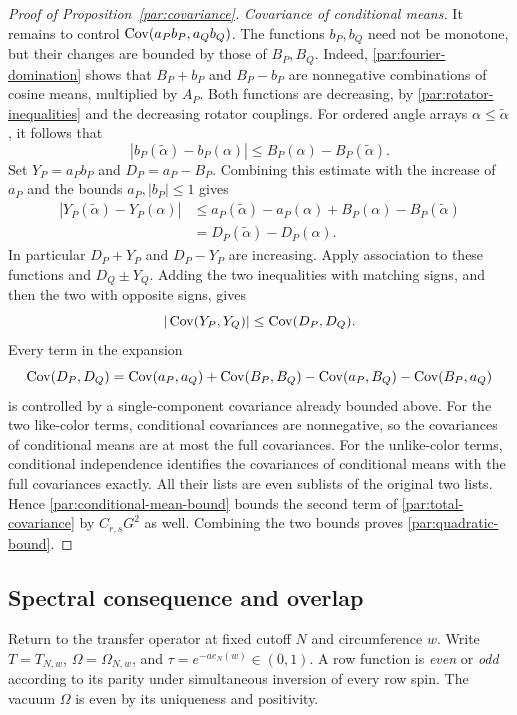 \begin{proof}[Proof of Proposition~\ref{par:covariance}]
\emph{Covariance of conditional means.}
It remains to control $\operatorname{Cov}(a_Pb_P,a_Qb_Q)$. The functions $b_P,b_Q$
need not be monotone, but their changes are bounded by those of
$B_P,B_Q$. Indeed, \eqref{par:fourier-domination} shows that
$B_P+b_P$ and $B_P-b_P$ are nonnegative combinations of cosine means,
multiplied by $A_P$. Both functions are decreasing, by
\eqref{par:rotator-inequalities} and the decreasing rotator couplings.
For ordered angle arrays $\alpha\le\widetilde\alpha$, it follows that
\[
 |b_P(\widetilde\alpha)-b_P(\alpha)|
       \le B_P(\alpha)-B_P(\widetilde\alpha).
\]
Set $Y_P=a_Pb_P$ and $D_P=a_P-B_P$. Combining this estimate with the
increase of $a_P$ and the bounds $a_P,|b_P|\le1$ gives
\begin{align*}
 |Y_P(\widetilde\alpha)-Y_P(\alpha)|
 &\le a_P(\widetilde\alpha)-a_P(\alpha)
                  +B_P(\alpha)-B_P(\widetilde\alpha)\\
 &=D_P(\widetilde\alpha)-D_P(\alpha).
\end{align*}
In particular $D_P+Y_P$ and $D_P-Y_P$ are increasing.
Apply association to these functions and $D_Q\pm Y_Q$. Adding the two
inequalities with matching signs, and then the two with opposite signs,
gives
\begin{equation}\label{par:conditional-mean-bound}
               |\operatorname{Cov}(Y_P,Y_Q)|\le\operatorname{Cov}(D_P,D_Q).
\end{equation}
Every term in the expansion
\[
 \operatorname{Cov}(D_P,D_Q)
 =\operatorname{Cov}(a_P,a_Q)+\operatorname{Cov}(B_P,B_Q)
       -\operatorname{Cov}(a_P,B_Q)-\operatorname{Cov}(B_P,a_Q)
\]
is controlled by a single-component covariance already bounded above.
For the two like-color terms, conditional covariances are nonnegative,
so the covariances of conditional means are at most the full covariances.
For the unlike-color terms, conditional independence identifies the
covariances of conditional means with the full covariances exactly.
All their lists are even sublists of the original two lists. Hence
\eqref{par:conditional-mean-bound} bounds the second term of
\eqref{par:total-covariance} by $C_{r,s}G^2$ as well. Combining the two
bounds proves \eqref{par:quadratic-bound}.
\end{proof}

\subsection{Spectral consequence and overlap}

Return to the transfer operator at fixed cutoff $N$ and circumference $w$.
Write $T=T_{N,w}$, $\Omega=\Omega_{N,w}$, and
$\tau=e^{-ae_N(w)}\in(0,1)$. A row function is \emph{even} or \emph{odd}
according to its parity under simultaneous inversion of every row spin.
The vacuum $\Omega$ is even by its uniqueness and positivity.

